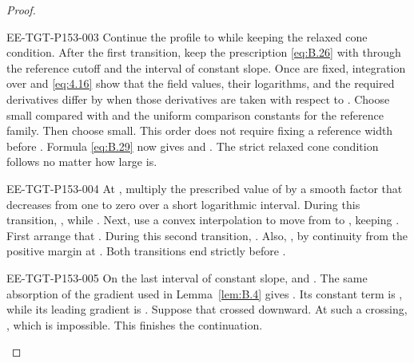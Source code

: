 \begin{proof}
\begin{EESegment}{EE-TGT-P153-003}
Continue the profile to  while keeping the relaxed cone condition. After
the first transition, keep the prescription \eqref{eq:B.26} with
 through the reference cutoff and the interval of constant
slope. Once  are fixed, integration over
 and \eqref{eq:4.16} show that the field values, their
logarithms, and the required derivatives differ by  when
those derivatives are taken with respect to . Choose
 small compared with
 and the uniform comparison constants for the reference family. Then
choose  small. This order does not require fixing a reference width before
. Formula \eqref{eq:B.29} now gives
 and . The strict relaxed cone
condition follows no matter how large  is.
\end{EESegment}

\begin{EESegment}{EE-TGT-P153-004}
At , multiply the prescribed value of
 by a smooth factor  that decreases
from one to zero over a short logarithmic interval. During this transition,
,
while . Next, use a convex interpolation to move
 from  to
, keeping . First arrange that
. During this second transition,
. Also, , by continuity
from the positive margin at . Both transitions end strictly
before .
\end{EESegment}

\begin{EESegment}{EE-TGT-P153-005}
On the last interval of constant slope,  and
. The same absorption of the gradient used in Lemma~\ref{lem:B.4} gives
. Its constant term is
, while its leading gradient is
. Suppose that  crossed downward.
At such a crossing,
, which is impossible. This finishes
the continuation.
\end{EESegment}
\end{proof}

